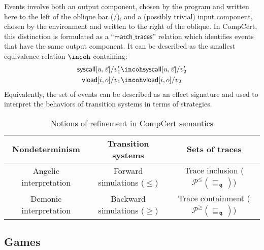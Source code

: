 \documentclass[sigplan,10pt,review,anonymous]{acmart}
\newcommand{\kw}[1]{\ensuremath{\mathsf{#1}}}
\newcommand{\refby}{\sqsubseteq}
\begin{document}
Events involve both an output component,
chosen by the program and
written here to the left of the oblique bar ($/$),
and a (possibly trivial) input component,
chosen by the environment and written to the right of the oblique.
In CompCert,
this distinction is formulated as a ``$\kw{match\_traces}$'' relation
which identifies events that have the same output component.
It can be described as the smallest equivalence relation $\incoh$
containing:
\begin{align*}
  \kw{syscall}[u, \vec{v}]/v_1' &\incoh
  \kw{syscall}[u, \vec{v}]/v_2'
  \\
  \kw{vload}[i, o]/v_1 &\incoh
  \kw{vload}[i, o]/v_2
\end{align*}
Equivalently,
the set of events can be described as an effect signature
and used to interpret the behaviors of transition systems
in terms of strategies.


\begin{table*} %
  \caption{Notions of refinement in CompCert semantics}
  \label{tbl:compcertref}
  \centering
  \begin{tabular}{ccc}
    \hline
    Nondeterminism
      & Transition systems
      & Sets of traces \\
    \hline
    Angelic interpretation
      & Forward simulations ($\le$)
      & Trace inclusion ($\mathcal{P}^\le(\refby_\lightning)$) \\
    Demonic interpretation
      & Backward simulations ($\ge$)
      & Trace containment ($\mathcal{P}^\ge(\refby_\lightning)$) \\
    \hline
  \end{tabular}
\end{table*}

\subsection{Games} \label{sec:sem:games} %
\end{document}
